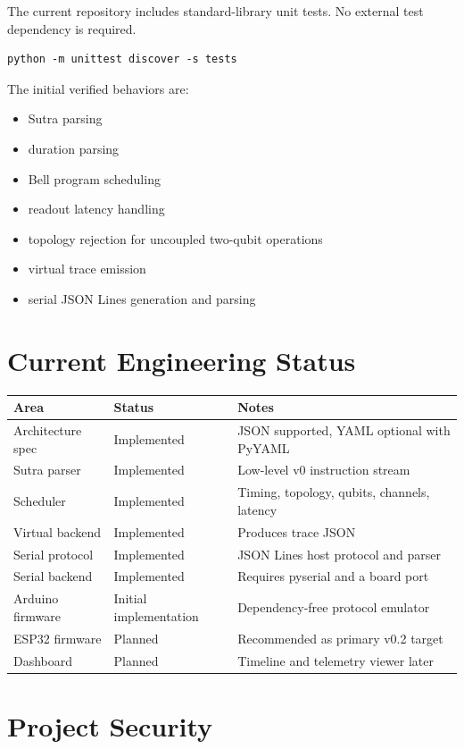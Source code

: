 \documentclass[11pt,a4paper]{article}
\begin{document}
The current repository includes standard-library unit tests. No external test dependency is required.

\begin{lstlisting}[style=astra]
python -m unittest discover -s tests
\end{lstlisting}

The initial verified behaviors are:

\begin{itemize}[leftmargin=*]
  \item Sutra parsing
  \item duration parsing
  \item Bell program scheduling
  \item readout latency handling
  \item topology rejection for uncoupled two-qubit operations
  \item virtual trace emission
  \item serial JSON Lines generation and parsing
\end{itemize}

\section{Current Engineering Status}

\begin{longtable}{lll}
\toprule
Area & Status & Notes \\
\midrule
Architecture spec & Implemented & JSON supported, YAML optional with PyYAML \\
Sutra parser & Implemented & Low-level v0 instruction stream \\
Scheduler & Implemented & Timing, topology, qubits, channels, latency \\
Virtual backend & Implemented & Produces trace JSON \\
Serial protocol & Implemented & JSON Lines host protocol and parser \\
Serial backend & Implemented & Requires pyserial and a board port \\
Arduino firmware & Initial implementation & Dependency-free protocol emulator \\
ESP32 firmware & Planned & Recommended as primary v0.2 target \\
Dashboard & Planned & Timeline and telemetry viewer later \\
\bottomrule
\end{longtable}

\section{Project Security}
\end{document}

